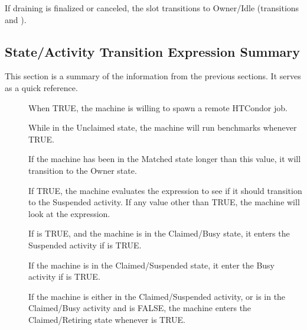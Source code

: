 If draining is finalized or canceled, the slot transitions to
Owner/Idle (transitions  and ).

\subsection{\label{sec:State-Expression-Summary}
State/Activity Transition Expression Summary}
This section is a summary of the information from the
previous sections.
It serves as a quick reference.

\begin{description}
  
\item[] When TRUE, the machine is willing to spawn
  a remote HTCondor job.
  
\item[] While in the Unclaimed state, the machine
  will run benchmarks whenever TRUE.
  
\item[] If the machine has been in the Matched
  state longer than this value, it will transition to the Owner state.
  
\item[] If TRUE, the machine evaluates
  the  expression to see if it should transition to the
  Suspended activity.  
  If any value other than TRUE, the machine will look at
  the  expression.
  
\item[] If  is TRUE, and the machine
  is in the Claimed/Busy state, it enters the Suspended activity
  if  is TRUE.
  
\item[] If the machine is in the Claimed/Suspended
  state, it enter the Busy activity if  is TRUE.
  
\item[] If the machine is either in the Claimed/Suspended
  activity, or is in the Claimed/Busy activity and
   is FALSE, the machine enters the Claimed/Retiring
  state whenever  is TRUE. 


\end{description}
